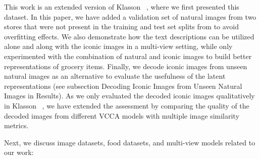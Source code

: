 This work is an extended version of Klasson \etal~, where we first presented this dataset. In this paper, we have added a validation set of natural images from two stores that were not present in the training and test set splits from  to avoid overfitting effects. We also demonstrate how the text descriptions can be utilized alone and along with the iconic images in a multi-view setting, while  only experimented with the combination of natural and iconic images to build better representations of grocery items. Finally, we decode iconic images from unseen natural images as an alternative to evaluate the usefulness of the latent representations (see subsection Decoding Iconic Images from Unseen Natural Images in Results).
As we only evaluated the decoded iconic images qualitatively in Klasson \etal~, we have extended the assessment by comparing the quality of the decoded images from different VCCA models with multiple image similarity metrics. 

Next, we discuss image datasets, food datasets, and multi-view models related to our work:

\vspace{-3mm}
